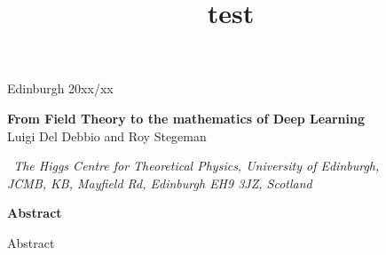 \documentclass[11pt,a4paper]{article}
\title{test}
\begin{document}
\vspace{-2.0cm}
\begin{flushright}
  Edinburgh 20xx/xx
\end{flushright}
\vspace{0.3cm}

\begin{center}
  {\Large \bf From Field Theory to the mathematics of Deep Learning}\\
  \vspace{1.1cm}
  {\small
    Luigi Del Debbio and Roy Stegeman
  }\\

  \vspace{0.7cm}

  {\it \small
  ~The Higgs Centre for Theoretical Physics, University of Edinburgh,\\
  JCMB, KB, Mayfield Rd, Edinburgh EH9 3JZ, Scotland
  }

  \vspace{1.0cm}

  {\bf \large Abstract}
\end{center}

Abstract

\clearpage

\tableofcontents


\cite{Buckley:2014ana}



\end{document}
